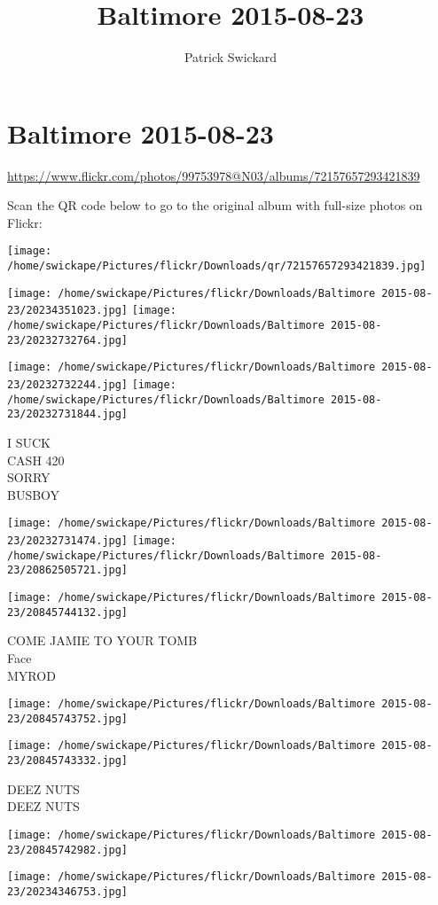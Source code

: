 \documentclass[10pt,letterpaper]{article}
\title{Baltimore 2015-08-23}
\author{Patrick Swickard}
\date{}
\begin{document}
\section*{Baltimore 2015-08-23}

\url{https://www.flickr.com/photos/99753978@N03/albums/72157657293421839}

Scan the QR code below to go to the original album with full-size photos on Flickr:

\texttt{[image: /home/swickape/Pictures/flickr/Downloads/qr/72157657293421839.jpg]}
\pagebreak

\texttt{[image: /home/swickape/Pictures/flickr/Downloads/Baltimore 2015-08-23/20234351023.jpg]}
\texttt{[image: /home/swickape/Pictures/flickr/Downloads/Baltimore 2015-08-23/20232732764.jpg]}

\texttt{[image: /home/swickape/Pictures/flickr/Downloads/Baltimore 2015-08-23/20232732244.jpg]}
\texttt{[image: /home/swickape/Pictures/flickr/Downloads/Baltimore 2015-08-23/20232731844.jpg]}

I SUCK\\
CASH 420\\
SORRY\\
BUSBOY
\pagebreak

\texttt{[image: /home/swickape/Pictures/flickr/Downloads/Baltimore 2015-08-23/20232731474.jpg]}
\texttt{[image: /home/swickape/Pictures/flickr/Downloads/Baltimore 2015-08-23/20862505721.jpg]}

\texttt{[image: /home/swickape/Pictures/flickr/Downloads/Baltimore 2015-08-23/20845744132.jpg]}

COME JAMIE TO YOUR TOMB\\
Face\\
MYROD
\pagebreak

\texttt{[image: /home/swickape/Pictures/flickr/Downloads/Baltimore 2015-08-23/20845743752.jpg]}

\vspace{0.25in}
\texttt{[image: /home/swickape/Pictures/flickr/Downloads/Baltimore 2015-08-23/20845743332.jpg]}

DEEZ NUTS\\
DEEZ NUTS
\pagebreak

\texttt{[image: /home/swickape/Pictures/flickr/Downloads/Baltimore 2015-08-23/20845742982.jpg]}

\vspace{0.25in}
\texttt{[image: /home/swickape/Pictures/flickr/Downloads/Baltimore 2015-08-23/20234346753.jpg]}
\end{document}
